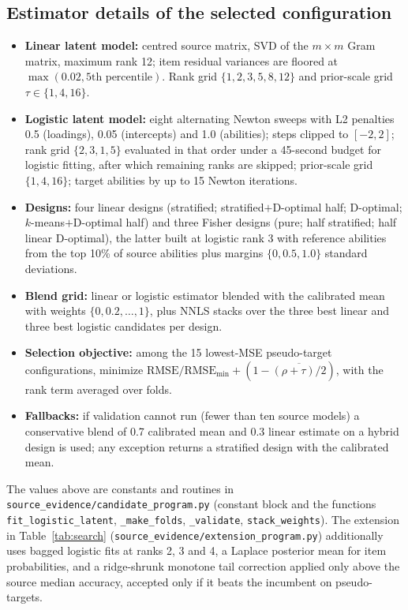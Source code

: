 \documentclass{article}
\begin{document}
\subsection{Estimator details of the selected configuration}
\begin{itemize}
\item \textbf{Linear latent model:} centred source matrix, SVD of the $m\times m$ Gram matrix, maximum rank 12; item residual variances are floored at $\max(0.02,\text{5th percentile})$. Rank grid $\{1,2,3,5,8,12\}$ and prior-scale grid $\tau\in\{1,4,16\}$.
\item \textbf{Logistic latent model:} eight alternating Newton sweeps with L2 penalties 0.5 (loadings), 0.05 (intercepts) and 1.0 (abilities); steps clipped to $[-2,2]$; rank grid $\{2,3,1,5\}$ evaluated in that order under a 45-second budget for logistic fitting, after which remaining ranks are skipped; prior-scale grid $\{1,4,16\}$; target abilities by up to 15 Newton iterations.
\item \textbf{Designs:} four linear designs (stratified; stratified$+$D-optimal half; D-optimal; $k$-means$+$D-optimal half) and three Fisher designs (pure; half stratified; half linear D-optimal), the latter built at logistic rank 3 with reference abilities from the top 10\% of source abilities plus margins $\{0,0.5,1.0\}$ standard deviations.
\item \textbf{Blend grid:} linear or logistic estimator blended with the calibrated mean with weights $\{0,0.2,\dots,1\}$, plus NNLS stacks over the three best linear and three best logistic candidates per design.
\item \textbf{Selection objective:} among the 15 lowest-MSE pseudo-target configurations, minimize $\mathrm{RMSE}/\mathrm{RMSE}_{\min}+(1-\overline{(\rho+\tau)/2})$, with the rank term averaged over folds.
\item \textbf{Fallbacks:} if validation cannot run (fewer than ten source models) a conservative blend of 0.7 calibrated mean and 0.3 linear estimate on a hybrid design is used; any exception returns a stratified design with the calibrated mean.
\end{itemize}
The values above are constants and routines in \texttt{source\_evidence/candidate\_program.py} (constant block and the functions \texttt{fit\_logistic\_latent}, \texttt{\_make\_folds}, \texttt{\_validate}, \texttt{stack\_weights}). The extension in Table~\ref{tab:search} (\texttt{source\_evidence/extension\_program.py}) additionally uses bagged logistic fits at ranks 2, 3 and 4, a Laplace posterior mean for item probabilities, and a ridge-shrunk monotone tail correction applied only above the source median accuracy, accepted only if it beats the incumbent on pseudo-targets.
\end{document}
